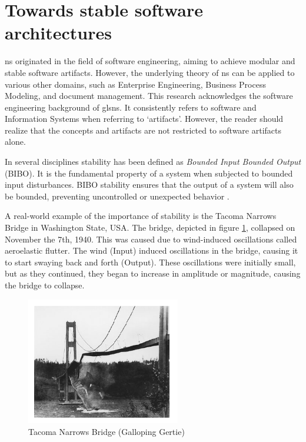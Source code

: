 \section{Towards stable software architectures} \label{sec:on_stability}


\gls{ns} originated in the field of software engineering, aiming to achieve modular and
stable software artifacts. However, the underlying theory of \gls{ns} can be applied to
various other domains, such as Enterprise Engineering, Business Process Modeling, and
document management. This research acknowledges the software engineering background of
gls{ns}. It consistently refers to software and Information Systems when referring to
\enquote*{artifacts}. However, the reader should realize that the concepts and artifacts
are not restricted to software artifacts alone.

In several disciplines stability has been defined as \emph{Bounded Input Bounded Output}
(BIBO). It is the fundamental property of a system when subjected to bounded input
disturbances. BIBO stability ensures that the output of a system will also be bounded,
preventing uncontrolled or unexpected behavior \parencite[270]{mannaert_normalized_2016}. 

A real-world example of the importance of stability is the Tacoma Narrows Bridge in
Washington State, USA. The bridge, depicted in figure \ref*{fig:bridge}, collapsed on
November the 7th, 1940. This was caused due to wind-induced oscillations called
aeroelastic flutter. The wind (Input) induced oscillations in the bridge, causing it to
start swaying back and forth (Output). These oscillations were initially small, but as
they continued, they began to increase in amplitude or magnitude, causing the bridge to
collapse.

\begin{figure}[H]
    \centering
    \includegraphics[width=0.6\textwidth]{Figures/bridge.pdf}
    \caption[TNB]{Tacoma Narrows Bridge (Galloping Gertie)}
    \label{fig:bridge}
\end{figure}

